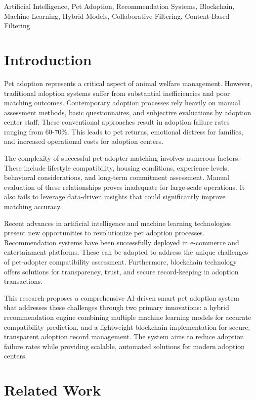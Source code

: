 \documentclass[conference]{IEEEtran}
\begin{document}
\begin{IEEEkeywords}
Artificial Intelligence, Pet Adoption, Recommendation Systems, Blockchain, Machine Learning, Hybrid Models, Collaborative Filtering, Content-Based Filtering
\end{IEEEkeywords}

\section{Introduction}

Pet adoption represents a critical aspect of animal welfare management. However, traditional adoption systems suffer from substantial inefficiencies and poor matching outcomes. Contemporary adoption processes rely heavily on manual assessment methods, basic questionnaires, and subjective evaluations by adoption center staff. These conventional approaches result in adoption failure rates ranging from 60-70\%. This leads to pet returns, emotional distress for families, and increased operational costs for adoption centers.

The complexity of successful pet-adopter matching involves numerous factors. These include lifestyle compatibility, housing conditions, experience levels, behavioral considerations, and long-term commitment assessment. Manual evaluation of these relationships proves inadequate for large-scale operations. It also fails to leverage data-driven insights that could significantly improve matching accuracy.

Recent advances in artificial intelligence and machine learning technologies present new opportunities to revolutionize pet adoption processes. Recommendation systems have been successfully deployed in e-commerce and entertainment platforms. These can be adapted to address the unique challenges of pet-adopter compatibility assessment. Furthermore, blockchain technology offers solutions for transparency, trust, and secure record-keeping in adoption transactions.

This research proposes a comprehensive AI-driven smart pet adoption system that addresses these challenges through two primary innovations: a hybrid recommendation engine combining multiple machine learning models for accurate compatibility prediction, and a lightweight blockchain implementation for secure, transparent adoption record management. The system aims to reduce adoption failure rates while providing scalable, automated solutions for modern adoption centers.

\section{Related Work}
\end{document}
